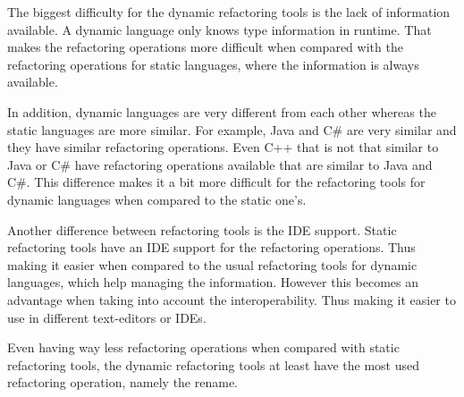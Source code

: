 The biggest difficulty for the dynamic refactoring tools is the lack of information available. 
A dynamic language only knows type information in runtime. 
That makes the refactoring operations more difficult when compared with the refactoring operations for static languages, where the information is always available.

In addition, dynamic languages are very different from each other whereas the static languages are more similar.
For example, Java and C\# are very similar and they have similar refactoring operations.
Even C++ that is not that similar to Java or C\# have refactoring operations available that are similar to Java and C\#. %
This difference makes it a bit more difficult for the refactoring tools for dynamic languages when compared to the static one's. %

Another difference between refactoring tools is the IDE support. 
Static refactoring tools have an IDE support for the refactoring operations. 
Thus making it easier when compared to the usual refactoring tools for dynamic languages, which help managing the information. 
However this becomes an advantage when taking into account the interoperability. 
Thus making it easier to use in different text-editors or IDEs.

Even having way less refactoring operations when compared with static refactoring tools, the dynamic refactoring tools at least have the most used refactoring operation, namely the rename.


